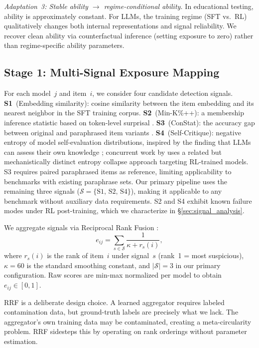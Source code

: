 \textit{Adaptation~3: Stable ability $\to$ regime-conditional ability.} In educational testing, ability is approximately constant. For LLMs, the training regime (SFT vs.\ RL) qualitatively changes both internal representations and signal reliability. We recover clean ability via counterfactual inference (setting exposure to zero) rather than regime-specific ability parameters.

\subsection{Stage 1: Multi-Signal Exposure Mapping}
\label{sec:stage1}

For each model~$j$ and item~$i$, we consider four candidate detection signals. \textbf{S1}~(Embedding similarity): cosine similarity between the item embedding and its nearest neighbor in the SFT training corpus. \textbf{S2}~(Min-K\%++): a membership inference statistic based on token-level surprisal \citep{zhang_2024_minkpp}. \textbf{S3}~(ConStat): the accuracy gap between original and paraphrased item variants \citep{dekoninck2024constat}. \textbf{S4}~(Self-Critique): negative entropy of model self-evaluation distributions, inspired by the finding that LLMs can assess their own knowledge \citep{kadavath2022}; concurrent work by \citet{tao2025detecting} uses a related but mechanistically distinct entropy collapse approach targeting RL-trained models. S3 requires paired paraphrased items as reference, limiting applicability to benchmarks with existing paraphrase sets. Our primary pipeline uses the remaining three signals ($\mathcal{S} = \{\text{S1, S2, S4}\}$), making it applicable to any benchmark without auxiliary data requirements. S2 and S4 exhibit known failure modes under RL post-training, which we characterize in \S\ref{sec:signal_analysis}.

We aggregate signals via Reciprocal Rank Fusion \citep[RRF;][]{cormack_2009_rrf}:
\begin{equation}
\label{eq:rrf}
    e_{ij} = \sum_{s \in \mathcal{S}} \frac{1}{\kappa + r_{s}(i)},
\end{equation}
where $r_s(i)$ is the rank of item~$i$ under signal~$s$ (rank~1 = most suspicious), $\kappa=60$ is the standard smoothing constant, and $|\mathcal{S}|=3$ in our primary configuration. Raw scores are min-max normalized per model to obtain $e_{ij} \in [0,1]$.

RRF is a deliberate design choice. A learned aggregator requires labeled contamination data, but ground-truth labels are precisely what we lack. The aggregator's own training data may be contaminated, creating a meta-circularity problem. RRF sidesteps this by operating on rank orderings without parameter estimation.

